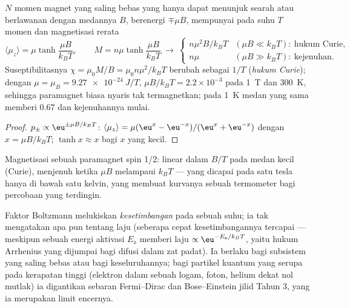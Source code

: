 \begin{proposition}\label{prop:b2:boltzmann-factor:curie}
$N$ momen magnet yang saling bebas yang hanya dapat menunjuk searah atau berlawanan dengan
medannya $B$, berenergi $\mp\mu B$, mempunyai pada suhu $T$ momen dan
magnetisasi rerata
\[
\langle\mu_z\rangle = \mu\tanh\frac{\mu B}{k_BT}, \qquad
M = n\mu\tanh\frac{\mu B}{k_BT}
\ \longrightarrow\
\begin{cases} n\mu^2B/k_BT & (\mu B \ll k_BT):\ \text{hukum Curie}, \\ n\mu & (\mu B \gg k_BT):\ \text{kejenuhan}. \end{cases}
\]
Suseptibilitasnya $\chi = \mu_0M/B = \mu_0n\mu^2/k_BT$ berubah sebagai $1/T$
(\emph{hukum Curie}\index{hukum Curie}); dengan $\mu = \mu_B = \qty{9.27e-24}{J/T}$,
$\mu B/k_BT = 2.2 \times 10^{-3}$ pada \qty{1}{T} dan \qty{300}{K}, sehingga
paramagnet biasa nyaris tak termagnetkan; pada \qty{1}{K} medan yang sama memberi
$0.67$ dan kejenuhannya mulai.
\end{proposition}

\begin{proof}
$p_\pm \propto\eu^{\pm\mu B/k_BT}$: $\langle\mu_z\rangle = \mu(\eu^x - \eu^{-x})/(\eu^x +
\eu^{-x})$ dengan $x = \mu B/k_BT$; $\tanh x \approx x$ bagi $x$ yang kecil.
\end{proof}

\begin{omfigure}

{\small Magnetisasi sebuah paramagnet spin 1/2: linear dalam $B/T$ pada
medan kecil (Curie), menjenuh ketika $\mu B$ melampaui $k_BT$ --- yang dicapai
pada satu tesla hanya di bawah satu kelvin, yang membuat kurvanya sebuah termometer
bagi percobaan yang terdingin.}
\end{omfigure}

\begin{remark}\label{rem:b2:boltzmann-factor:limits}
Faktor Boltzmann melukiskan \emph{kesetimbangan} pada sebuah suhu; ia
tak mengatakan apa pun tentang laju (seberapa cepat kesetimbangannya tercapai --- meskipun
sebuah energi aktivasi $E_{\text{a}}$ memberi laju $\propto\eu^{-E_{\text{a}}/k_BT}$,
yaitu hukum Arrhenius yang dijumpai bagi difusi dalam zat padat). Ia berlaku bagi
subsistem yang saling bebas atau bagi keseluruhannya; bagi partikel kuantum yang
serupa pada kerapatan tinggi (elektron dalam sebuah logam, foton, helium dekat
nol mutlak) ia digantikan sebaran Fermi--Dirac dan Bose--Einstein
jilid Tahun 3, yang ia merupakan limit encernya.
\end{remark}

